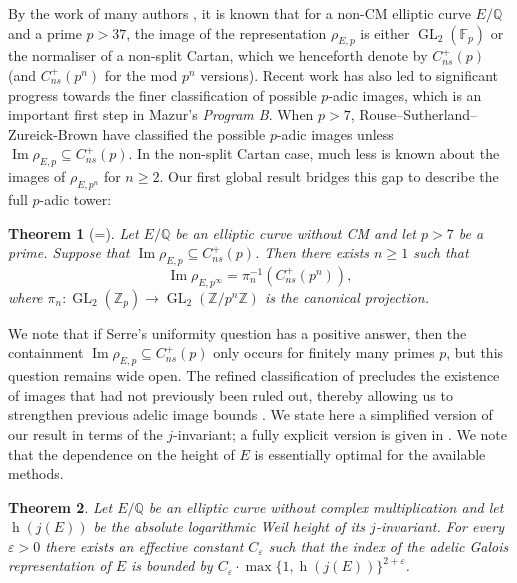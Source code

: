 \documentclass{amsart}
\newcommand{\op}[1]{\operatorname{#1}}
\newtheorem{theorem}{Theorem}
\theoremstyle{definition}
\newcommand{\Z}{\mathbb{Z}}
\newcommand{\Q}{\mathbb{Q}}
\newcommand{\F}{\mathbb{F}}
\newcommand{\GL}{\operatorname{GL}}
\numberwithin{theorem}{section}
\numberwithin{equation}{section}
\begin{document}
By the work of many authors \cite{serre81, mazur78, biluparent11, biluparent13, zywina15, lefournlemos21, furiolombardo23}, it is known that for a non-CM elliptic curve $E/\Q$ and a prime $p>37$, the image of the representation $\rho_{E,p}$ is either $\GL_2(\F_p)$ or the normaliser of a non-split Cartan, which we henceforth denote by $C_{ns}^+(p)$ (and $C_{ns}^+(p^n)$ for the mod $p^n$ versions). Recent work has also led to significant progress towards the finer classification of possible $p$-adic images, which is an important first step in Mazur's \textit{Program B}. When $p>7$, Rouse--Sutherland--Zureick-Brown \cite[Theorem 1.1.6]{rszb22} have classified the possible $p$-adic images unless $\op{Im}\rho_{E,p} \subseteq C_{ns}^+(p)$. In the non-split Cartan case, much less is known about the images of $\rho_{E, p^n}$ for $n \geq 2$. Our first global result bridges this gap to describe the full $p$-adic tower:

\begin{theorem}[=]\label{introthm: no sharp groups over Q}
Let $E/\Q$ be an elliptic curve without CM and let $p > 7$ be a prime. Suppose that $\op{Im} \rho_{E, p} \subseteq C_{ns}^+(p)$. Then there exists $n \geq 1$ such that
\[
\op{Im} \rho_{E, p^\infty} = \pi_n^{-1} \left(C_{ns}^+(p^n)\right),
\]
where $\pi_n : \GL_2(\Z_p) \to \GL_2(\Z/p^n\Z)$ is the canonical projection.
\end{theorem}

We note that if Serre's uniformity question has a positive answer, then the containment $\op{Im}\rho_{E,p} \subseteq C_{ns}^+(p)$ only occurs for finitely many primes $p$, but this question remains wide open. 
The refined classification of  precludes the existence of images that had not previously been ruled out, thereby allowing us to strengthen previous adelic image bounds \cite{MR3437765, furio24}. 
We state here a simplified version of our result in terms of the $j$-invariant; a fully explicit version is given in . We note that the dependence on the height of $E$ is essentially optimal for the available methods.

\begin{theorem}\label{introthm: adelic bound}
    Let $E/\Q$ be an elliptic curve without complex multiplication and let $\operatorname{h}(j(E))$ be the absolute logarithmic Weil height of its $j$-invariant. For every $\varepsilon > 0$ there exists an effective constant $C_\varepsilon$ such that the index of the adelic Galois representation of $E$ is bounded by $C_\varepsilon \cdot \max\{1, \operatorname{h}(j(E))\}^{2+\varepsilon}$.
\end{theorem}
\end{document}

